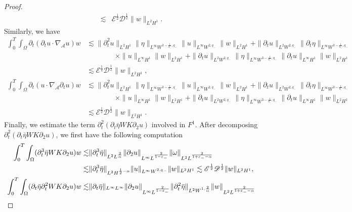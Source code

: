 \documentclass[10pt,a4paper]{amsart}
\def\p{\partial}
\begin{document}
\begin{proof}
\[\begin{aligned}
				\lesssim&  \mathscr{E}^{\frac{1}{2}}\mathscr{D}^{\frac{1}{2}}\|w\|_{L^{2}H^{1}}.
			\end{aligned}\]
			\noindent Similarly, we have
			\[\begin{aligned}
				\int_{0}^{T}\int_{\Omega}\p_{t}(\p_{t}u\cdot \nabla_\mathcal{A}u)w
				&\lesssim\|\p_{t}^{2}u\|_{L^{2}H^{1}}\|{\eta}\|_{L^{\infty}W^{3-\frac{1}{q_{-}},q_{-}}}\|u\|_{L^{\infty}W^{2,q_{-}}}\|w\|_{L^{2}H^{1}}+\|\p_{t}u\|_{L^{2}W^{2,q_{-}}}\|\p_{t}{\eta}\|_{L^{\infty}W^{3-\frac{1}{q_{-}},q_{-}}}\\
				&\qquad\qquad\times \|u\|_{L^{\infty}H^{1}}\|w\|_{L^{2}H^{1}}
				+\|\p_{t}u\|_{L^{2}W^{2,q_{-}}}\|{\eta}\|_{L^{\infty}W^{3-\frac{1}{q_{-}},q_{-}}}\|\p_{t}u\|_{L^{\infty}H^{1}}\|w\|_{L^{2}H^{1}}\\
				&\lesssim  \mathscr{E}^{\frac{1}{2}}\mathscr{D}^{\frac{1}{2}}\|w\|_{L^{2}H^{1}},
			\end{aligned}\]
			\[\begin{aligned}
				\int_{0}^{T}\int_{\Omega}\p_{t}(u\cdot \nabla_\mathcal{A}\p_{t}u)w
				& \lesssim\|\p_{t}^{2}u\|_{L^{2}H^{1}}\|{\eta}\|_{L^{\infty}W^{3-\frac{1}{q_{-}},q_{-}}}\|u\|_{L^{\infty}W^{2,q_{-}}}\|w\|_{L^{2}H^{1}}+\|\p_{t}u\|_{L^{2}W^{2,q_{-}}}\|\p_{t}{\eta}\|_{L^{\infty}W^{3-\frac{1}{q_{-}},q_{-}}}\\
				&\qquad\qquad\times\|u\|_{L^{\infty}H^{1}}\|w\|_{L^{2}H^{1}}+\|\p_{t}u\|_{L^{2}W^{2,q_{-}}}\|{\eta}\|_{L^{\infty}W^{3-\frac{1}{q_{-}},q_{-}}}\|\p_{t}u\|_{L^{\infty}H^{1}}\|w\|_{L^{2}H^{1}} \\
				&\lesssim  \mathscr{E}^{\frac{1}{2}}\mathscr{D}^{\frac{1}{2}}\|w\|_{L^{2}H^{1}}.
			\end{aligned}\]
			Finally, we estimate the term $\partial_{t}^{2}(\p_{t}\bar{\eta}WK\p_{2}u)$ involved in $F^{1}$. After decomposing $\partial_{t}^{2}(\p_{t}\bar{\eta}WK\p_{2}u)$, we first have the following computation
			\begin{align}{\label{eq:f_5}}
				\begin{aligned}
					\int_{0}^{T}\int_{\Omega}(\p_{t}^{3}\bar{\eta}WK\p_{2}u)w\lesssim&\|\p_{t}^3\bar{\eta}\|_{L^{2}L^{\frac{2}{\alpha}}}\|\p_{2}u\|_{L^{\infty}L^{\frac{2}{1-\varepsilon_{-}}}}\|\omega\|_{L^{2}L^{\frac{2}{1+\varepsilon_{-}-\alpha}}}\\
					\lesssim &\|\p_{t}^{3}\bar{\eta}\|_{L^{2}H^{\frac{1}{2}-\alpha}}\|u\|_{L^{\infty}W^{2,q_{-}}}\|w\|_{L^{2}H^{1}}\lesssim \mathscr{E}^{\frac{1}{2}}\mathscr{D}^{\frac{1}{2}}\|w\|_{L^{2}H^{1}},\\
					\int_{0}^{T}\int_{\Omega}(\p_{t}\bar{\eta}\p_{t}^{2}WK\p_{2}u)w\lesssim&\|\p_{t}\bar{\eta}\|_{L^{\infty}L^{\infty}}\|\p_{2}u\|_{L^{\infty}L^{\frac{2}{1-\varepsilon_{-}}}}\|\p_{t}^{2}\bar{\eta}\|_{L^{2}W^{1,\frac{2}{\alpha}}}\|w\|_{L^{2}L^{\frac{2}{1+\varepsilon_{-}-\alpha}}}\\

\end{aligned}
\end{align}
\end{proof}
\end{document}
